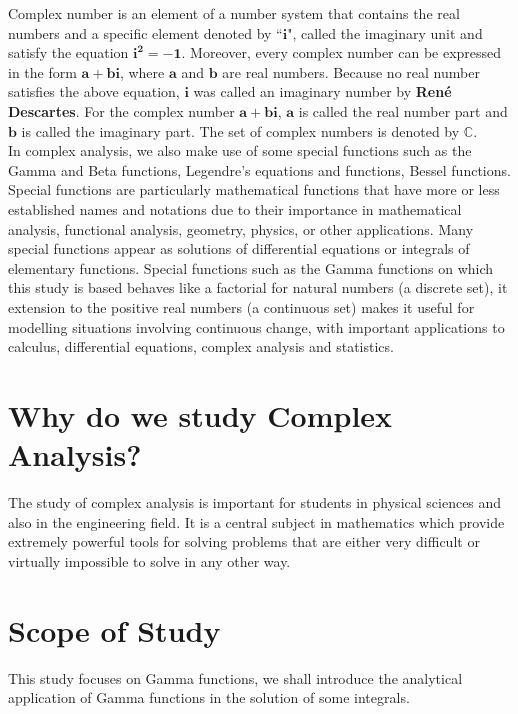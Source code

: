 \documentclass[11pt]{report}
\newcommand{\bt}[1]{\textbf{#1}}
\newcommand{\dsp}{\displaystyle}
\newcommand{\mbf}[1]{\mathbf{#1}}
\newcommand{\complex}{\mathbb{C}}
\begin{document}
	Complex number is an element of a number system that contains the real numbers and a specific element denoted by ``$\mbf{i}$", called the imaginary unit and satisfy the equation $\dsp \mbf{i^2 = -1}$. Moreover, every complex number can be expressed in the form $\mathbf{a+bi}$, where $\mbf{a}$ and $\mbf{b}$ are real numbers. Because no real number satisfies the above equation, $\mbf{i}$ was called an imaginary number by \bt{Ren\'{e} Descartes}. For the complex number $\dsp \mbf{a+bi}$, $\mbf{a}$ is called the real number part and $\mbf{b}$ is called the imaginary part. The set of complex numbers is denoted by $\complex$.\\
	
	In complex analysis, we also make use of some special functions such as the Gamma and Beta functions, Legendre's equations and functions, Bessel functions. Special functions are particularly mathematical functions that have more or less established names and notations due to their importance in mathematical analysis, functional analysis, geometry, physics, or other applications. Many special functions appear as solutions of differential equations or integrals of elementary functions. Special functions such as the Gamma functions on which this study is based behaves like a factorial for natural numbers (a discrete set), it extension to the positive real numbers (a continuous set) makes it useful for modelling situations involving continuous change, with important applications to calculus, differential equations, complex analysis and statistics.
	
	\section{Why do we study Complex Analysis?}
	The study of complex analysis is important for students in physical sciences and also in the engineering field. It is a central subject in mathematics which provide extremely powerful tools for solving problems that are either very difficult or virtually impossible to solve in any other way.
	
	\section{Scope of Study}
	This study focuses on Gamma functions, we shall introduce the analytical application of Gamma functions in the solution of some integrals. 
	
	
\end{document}
